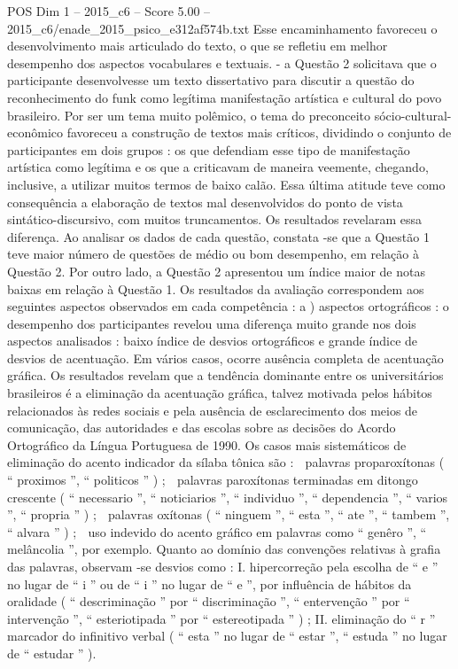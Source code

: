 \begin{textsample}{POS Dim 1 – 2015\_c6 – Score 5.00 – 2015\_c6/enade\_2015\_psico\_e312af574b.txt}
Esse encaminhamento favoreceu o desenvolvimento mais articulado do texto, o que se refletiu em melhor desempenho dos aspectos vocabulares e textuais. - a Questão 2 solicitava que o participante desenvolvesse um texto dissertativo para discutir a questão do reconhecimento do funk como legítima manifestação artística e cultural do povo brasileiro.
Por ser um tema muito polêmico, o tema do preconceito sócio-cultural-econômico favoreceu a construção de textos mais críticos, dividindo o conjunto de participantes em dois grupos : os que defendiam esse tipo de manifestação artística como legítima e os que a criticavam de maneira veemente, chegando, inclusive, a utilizar muitos termos de baixo calão.
Essa última atitude teve como consequência a elaboração de textos mal desenvolvidos do ponto de vista sintático-discursivo, com muitos truncamentos.
Os resultados revelaram essa diferença.
Ao analisar os dados de cada questão, constata -se que a Questão 1 teve maior número de questões de médio ou bom desempenho, em relação à Questão 2.
Por outro lado, a Questão 2 apresentou um índice maior de notas baixas em relação à Questão 1.
Os resultados da avaliação correspondem aos seguintes aspectos observados em cada competência : a ) aspectos ortográficos : o desempenho dos participantes revelou uma diferença muito grande nos dois aspectos analisados : baixo índice de desvios ortográficos e grande índice de desvios de acentuação.
Em vários casos, ocorre ausência completa de acentuação gráfica.
Os resultados revelam que a tendência dominante entre os universitários brasileiros é a eliminação da acentuação gráfica, talvez motivada pelos hábitos relacionados às redes sociais e pela ausência de esclarecimento dos meios de comunicação, das autoridades e das escolas sobre as decisões do Acordo Ortográfico da Língua Portuguesa de 1990.
Os casos mais sistemáticos de eliminação do acento indicador da sílaba tônica são :  palavras proparoxítonas ( “ proximos ”, “ politicos ” ) ;  palavras paroxítonas terminadas em ditongo crescente ( “ necessario ”, “ noticiarios ”, “ individuo ”, “ dependencia ”, “ varios ”, “ propria ” ) ;  palavras oxítonas ( “ ninguem ”, “ esta ”, “ ate ”, “ tambem ”, “ alvara ” ) ;  uso indevido do acento gráfico em palavras como “ genêro ”, “ melâncolia ”, por exemplo.
Quanto ao domínio das convenções relativas à grafia das palavras, observam -se desvios como : I. hipercorreção pela escolha de “ e ” no lugar de “ i ” ou de “ i ” no lugar de “ e ”, por influência de hábitos da oralidade ( “ descriminação ” por “ discriminação ”, “ entervenção ” por “ intervenção ”, “ esteriotipada ” por “ estereotipada ” ) ; II. eliminação do “ r ” marcador do infinitivo verbal ( “ esta ” no lugar de “ estar ”, “ estuda ” no lugar de “ estudar ” ).

\end{textsample}
